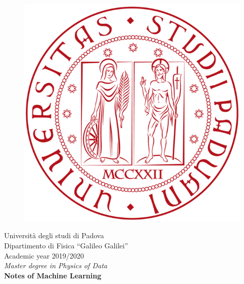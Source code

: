 \documentclass[12pt]{report}
\theoremstyle{plain}
\begin{document}
\begin{flushleft}
	
	\begin{center}
		\begin{figure}
			\centering
			\includegraphics[scale=.13]{images/logo_unipd.png}
		\end{figure}
		Università degli studi di Padova\\
		Dipartimento di Fisica “Galileo Galilei”\\
		Academic year 2019/2020\\

		\vspace{1cm}		
		\large{\textit{Master degree in Physics of Data}}\\
		\vspace{1cm}
		\huge{\textbf{Notes of Machine Learning}}
	\end{center}
	
\tableofcontents



\end{flushleft}
\end{document}
